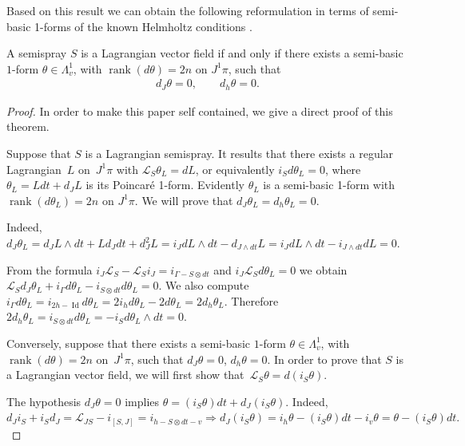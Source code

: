 \documentclass[pdftex]{sigma}
\begin{document}
Based on this result we can obtain the following reformulation in
terms of semi-basic 1-forms of the known Helmholtz conditions \cite[Lemma~4.2, Lemma~4.3,  Theorem~4.5, Theorem~5.1]{B-C-2010}.

\begin{theorem}
A semispray $S$ is a Lagrangian vector field if and only if there
exists a semi-basic $1$-form $\theta\in\Lambda_{v}^{1}$, with $\operatorname{rank}(d\theta)=2n$
on $J^{1}\pi$, such that \begin{gather}
d_{J}\theta=0,\qquad  d_{h}\theta=0.\label{eq:P}
\end{gather}
\end{theorem}
\begin{proof}
In order to make this paper self contained, we give a direct proof
of this theorem.

Suppose that $S$ is a Lagrangian semispray. It results that there
exists a regular Lagrangian~$L$ on~$J^{1}\pi$ with $\mathcal{L}_{S}\theta_{L}=dL$,
or equivalently $i_{S}d\theta_{L}=0$, where $\theta_{L}=Ldt+d_{J}L$
is its Poincar\'e 1-form. Evidently $\theta_{L}$ is a semi-basic 1-form
with $\operatorname{rank}(d\theta_{L})=2n$ on $J^{1}\pi$. We will
prove that $d_{J}\theta_{L}=d_{h}\theta_{L}=0$.

Indeed, $d_{J}\theta_{L}=d_{J}L\wedge dt+Ld_{J}dt+d_{J}^{2}L=i_{J}dL\wedge dt-d_{J\wedge dt}L=i_{J}dL\wedge dt-i_{J\wedge dt}dL=0$.

From the formula $i_{J}\mathcal{L}_{S}-\mathcal{L}_{S}i_{J}=i_{\Gamma-S\otimes dt}$
and $i_{J}\mathcal{L}_{S}d\theta_{L}=0$ we obtain $\mathcal{L}_{S}d_{J}\theta_{L}+i_{\Gamma}d\theta_{L}-i_{S\otimes dt}d\theta_{L}=0$.
We also compute $i_{\Gamma}d\theta_{L}=i_{2h-\operatorname{Id}}d\theta_{L}=2i_{h}d\theta_{L}-2d\theta_{L}=2d_{h}\theta_{L}$.
Therefore $2d_{h}\theta_{L}=i_{S\otimes dt}d\theta_{L}=-i_{S}d\theta_{L}\wedge dt=0$.

Conversely, suppose that there exists a semi-basic $1$-form $\theta\in\Lambda_{v}^{1}$,
with $\operatorname{rank}(d\theta)=2n$ on~$J^{1}\pi$, such that
$d_{J}\theta=0$, $d_{h}\theta=0$. In order to prove that $S$ is
a Lagrangian vector f\/ield, we will f\/irst show that~$\mathcal{L}_{S}\theta=d(i_{S}\theta)$.

The hypothesis $d_{J}\theta=0$ implies $\theta=(i_{S}\theta)dt+d_{J}(i_{S}\theta).$
Indeed, $d_{J}i_{S}+i_{S}d_{J}=\mathcal{L}_{JS}-i_{[S,J]}=i_{h-S\otimes dt-v}\Rightarrow d_{J}(i_{S}\theta)=i_{h}\theta-(i_{S}\theta)dt-i_{v}\theta=\theta-(i_{S}\theta)dt.$


\end{proof}
\end{document}

